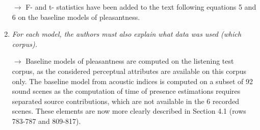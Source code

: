 \documentclass[10pt]{article}
\begin{document}
\begin{enumerate}
$\rightarrow$ F- and t- statistics have been added to the text following equations 5 and 6 on the baseline models of pleasantness.

\item \emph{For each model, the authors must also explain what data was used (which corpus).}

$\rightarrow$ Baseline models of pleasantness are computed on the listening test corpus, as the considered perceptual attributes are available on this corpus only. The baseline model from acoustic indices is computed on a subset of 92 sound scenes as the computation of time of presence estimations requires separated source contributions, which are not available in the 6 recorded scenes. These elements are now more clearly described in Section 4.1 (rows 783-787 and 809-817).

\end{enumerate}





\end{document}
